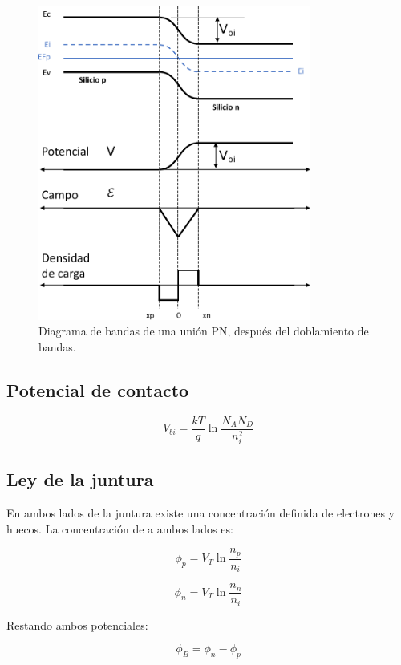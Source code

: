 \begin{figure}[H]
    \centering
    \includegraphics[width=0.8\textwidth]{figuras/union-pn_despues.pdf}
    \caption{Diagrama de bandas de una unión PN, después del doblamiento de bandas.}
    \label{union-pn_despues}
\end{figure}


\newpage
\subsection{Potencial de contacto}

\[ V_{bi} = \dfrac{kT}{q} \ln \dfrac{N_A N_D}{n_i^2} \]





\subsection{Ley de la juntura}

En ambos lados de la juntura existe una concentración definida de electrones y huecos. La concentración de a ambos lados es:

\[ \phi_p = V_T \ln \dfrac{n_p}{n_i} \] 

\[ \phi_n = V_T \ln \dfrac{n_n}{n_i} \]

Restando ambos potenciales:

\[ \phi_B = \phi_n - \phi_p \]


